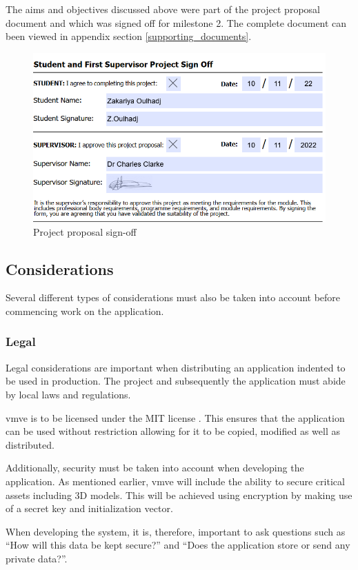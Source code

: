 \documentclass[11pt]{article}
\begin{document}
The aims and objectives discussed above were part of the project proposal
document and which was signed off for milestone 2. The complete document can
been viewed in appendix section \ref{supporting_documents}.
\begin{figure}[H]
  \centering
  \includegraphics[width=\textwidth]{images/project_signoff.png}
  \caption{Project proposal sign-off}
  \label{fig:project_signoff}
\end{figure}

\subsection{Considerations}
Several different types of considerations must also be taken into account before
commencing work on the application.

\subsubsection{Legal}
Legal considerations are important when distributing an application indented to
be used in production. The project and subsequently the application must abide by
local laws and regulations.

\gls*{vmve} is to be licensed under the MIT license \cite{mit}. This ensures
that the application can be used without restriction allowing for it to be
copied, modified as well as distributed.

Additionally, security must be taken into account when developing the
application. As mentioned earlier, \gls*{vmve} will include the ability to
secure critical assets including 3D models. This will be achieved using
encryption by making use of a secret key and initialization vector.

When developing the system, it is, therefore, important to ask questions such as
``How will this data be kept secure?'' and ``Does the application store or send
any private data?''. 
\end{document}
